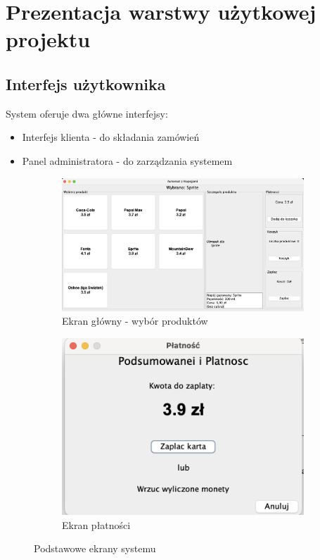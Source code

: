 \section{Prezentacja warstwy użytkowej projektu}
\subsection{Interfejs użytkownika}
System oferuje dwa główne interfejsy:
\begin{itemize}
\item Interfejs klienta - do składania zamówień
\item Panel administratora - do zarządzania systemem
\end{itemize}

\begin{figure}[H]
\centering
\begin{subfigure}{0.45\textwidth}
\includegraphics[width=\textwidth]{figures/main_screen.png}
\caption{Ekran główny - wybór produktów}
\label{fig:main_screen}
\end{subfigure}
\begin{subfigure}{0.45\textwidth}
\includegraphics[width=\textwidth]{figures/payment_screen.png}
\caption{Ekran płatności}
\label{fig:payment_screen}
\end{subfigure}
\caption{Podstawowe ekrany systemu}
\end{figure}


